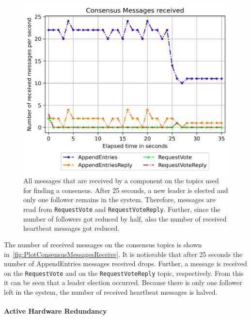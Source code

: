 \begin{figure}[!hb]
	\centering
	\includegraphics[width=0.75\linewidth]{images/plots/ConsensusMessagesReceive}
	\caption{All messages that are received by a component on the topics used for finding a consensus. After 25 seconds, a new leader is elected and only one follower remains in the system. Therefore, messages are read from \texttt{RequestVote} and \texttt{RequestVoteReply}. Further, since the number of followers got reduced by half, also the number of received heartbeat messages got reduced.}
	\label{fig:PlotConsensusMessagesReceive}
\end{figure}

The number of received messages on the consensus topics is shown in~\autoref{fig:PlotConsensusMessagesReceive}.
It is noticeable that after 25 seconds the number of AppendEntries messages received drops.
Further, a message is received on the \texttt{RequestVote} and on the \texttt{RequestVoteReply} topic, respectively.
From this it can be seen that a leader election occurred.
Because there is only one follower left in the system, the number of received heartbeat messages is halved.

\paragraph{Active Hardware Redundancy}

